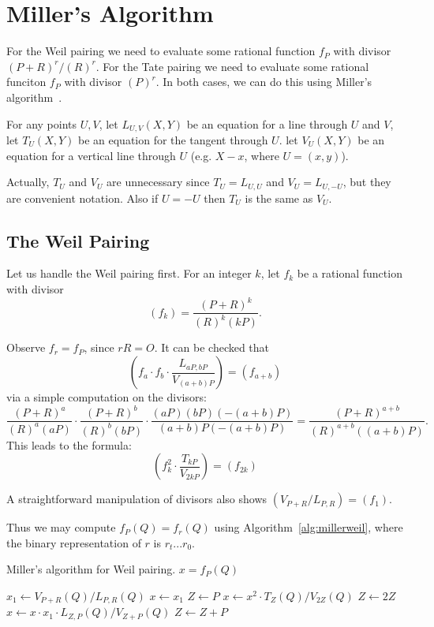 \section {Miller's Algorithm}

For the Weil pairing we need to evaluate some rational function
$f_P$ with divisor $(P+R)^r /(R)^r$.
For the Tate pairing we need to evaluate some rational funciton
$f_P$ with divisor $(P)^r$.
In both cases, we can do this using Miller's algorithm~\cite{miller,millerpub}.

For any points $U, V$,
let $L_{U,V}(X,Y)$ be an equation for a line through $U$ and $V$,
let $T_{U}(X,Y)$ be an equation for the tangent through $U$.
let
$V_{U}(X,Y)$ be an equation for a vertical line through $U$ (e.g.
$X - x$, where $U = (x, y)$).

Actually, $T_U$ and $V_U$ are unnecessary since
$T_U = L_{U,U}$ and $V_U = L_{U,-U}$, but they are convenient notation.
Also if $U = -U$ then $T_U$ is the same as $V_U$.

\subsection {The Weil Pairing}

Let us handle the Weil pairing first. For an integer $k$, let
$f_k$ be a rational function with divisor
\[
(f_k) = \frac{(P+R)^k}{(R)^k(kP)} .
\]

Observe $f_r = f_P$, since $rR = O$.
It can be checked that
\[
\left(
f_a \cdot f_b \cdot \frac{L_{aP,bP}}{V_{(a+b)P}}
\right) = (f_{a+b})
\]
via a simple computation on the divisors:
\[
\frac{(P+R)^a}{(R)^a(aP)}
\cdot
\frac{(P+R)^b}{(R)^b(bP)}
\cdot
\frac{(aP)(bP)(-(a+b)P)}{(a+b)P(-(a+b)P)}
=
\frac{(P+R)^{a+b}}{(R)^{a+b}((a+b)P)} .
\]
This leads to the formula:
\[
\left(
f_k^2 \cdot \frac{T_{kP}}{V_{2kP}}
\right) = (f_{2k})
\]

A straightforward manipulation of divisors also shows
$( V_{P+R} / L_{P,R}) = (f_1)$.

Thus we may compute $f_P(Q) = f_r(Q)$ using Algorithm~\ref{alg:millerweil},
where the binary representation of $r$ is $r_t ... r_0$.

\begin{algorithm}
\caption{\label{alg:millerweil}Miller's algorithm for Weil pairing. $x = f_P(Q)$}
\begin{algorithmic}[1]
\STATE $x_1 \gets V_{P+R}(Q) / L_{P,R}(Q)$
\STATE $x \gets x_1$
\STATE $Z \gets P$
    \STATE $x \gets x^2 \cdot T_Z(Q) / V_{2Z}(Q)$
    \STATE $Z \gets 2Z$
	\STATE $x \gets x \cdot x_1 \cdot L_{Z, P}(Q) / V_{Z+P}(Q)$
	\STATE $Z \gets Z + P$
    \ENDIF
\ENDFOR
\end{algorithmic}
\end{algorithm}

